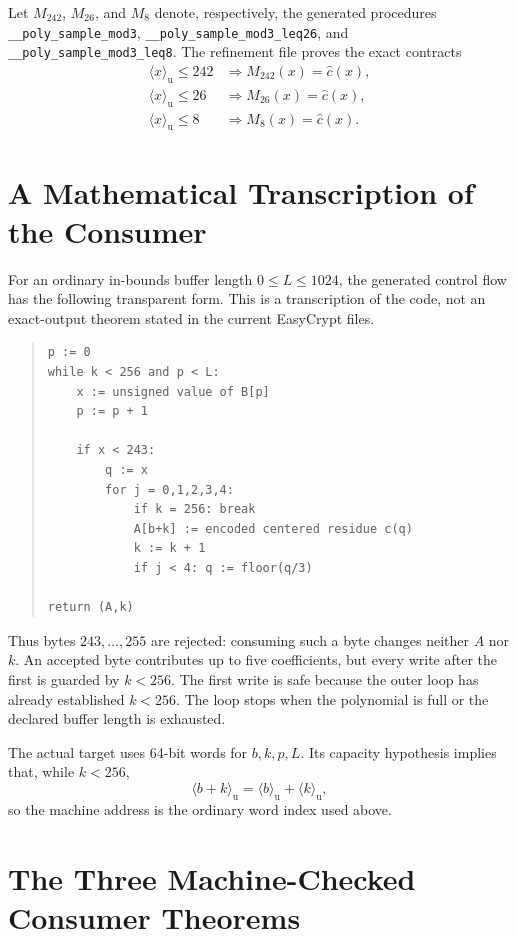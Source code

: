 \documentclass[11pt]{article}
\theoremstyle{definition}
\theoremstyle{plain}
\theoremstyle{remark}
\newcommand{\code}[1]{\nolinkurl{#1}}
\newcommand{\uint}[1]{\langle #1\rangle_{\mathrm u}}
\begin{document}
Let $M_{242}$, $M_{26}$, and $M_8$ denote, respectively, the generated
procedures \code{__poly_sample_mod3},
\code{__poly_sample_mod3_leq26}, and
\code{__poly_sample_mod3_leq8}.  The refinement file proves the exact
contracts
\begin{align*}
 \uint{x}\le242
   &\Longrightarrow M_{242}(x)=\widehat c(x),\\
 \uint{x}\le26
   &\Longrightarrow M_{26}(x)=\widehat c(x),\\
 \uint{x}\le8
   &\Longrightarrow M_8(x)=\widehat c(x).
\end{align*}

\section{A Mathematical Transcription of the Consumer}
\label{sec:transcription}

For an ordinary in-bounds buffer length $0\le L\le1024$, the generated
control flow has the following transparent form.  This is a transcription of
the code, not an exact-output theorem stated in the current EasyCrypt files.

\begin{quote}
\begin{verbatim}
p := 0
while k < 256 and p < L:
    x := unsigned value of B[p]
    p := p + 1

    if x < 243:
        q := x
        for j = 0,1,2,3,4:
            if k = 256: break
            A[b+k] := encoded centered residue c(q)
            k := k + 1
            if j < 4: q := floor(q/3)

return (A,k)
\end{verbatim}
\end{quote}

Thus bytes $243,\ldots,255$ are rejected: consuming such a byte changes
neither $A$ nor $k$.  An accepted byte contributes up to five coefficients,
but every write after the first is guarded by $k<256$.  The first write is
safe because the outer loop has already established $k<256$.  The loop stops
when the polynomial is full or the declared buffer length is exhausted.

The actual target uses 64-bit words for $b,k,p,L$.  Its capacity hypothesis
implies that, while $k<256$,
\[
  \uint{b+k}=\uint{b}+\uint{k},
\]
so the machine address is the ordinary word index used above.

\section{The Three Machine-Checked Consumer Theorems}
\end{document}
